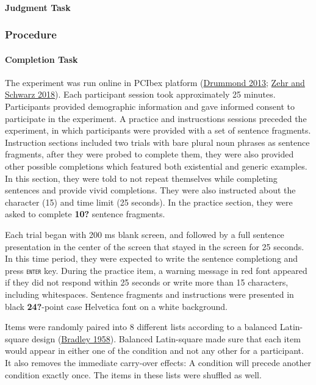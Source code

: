 \documentclass[
  10pt,
  letterpaper,
  DIV=11,
  numbers=noendperiod]{scrartcl}
\let\oldparagraph\paragraph
\renewcommand{\paragraph}[1]{\oldparagraph{#1}\mbox{}}
\begin{document}
\hypertarget{judgment-task}{%
\paragraph{Judgment Task}\label{judgment-task}}

\hypertarget{procedure}{%
\subsubsection{Procedure}\label{procedure}}

\hypertarget{completion-task-1}{%
\paragraph{Completion Task}\label{completion-task-1}}

The experiment was run online in PCIbex platform
(\protect\hyperlink{ref-Drummond2013}{Drummond 2013};
\protect\hyperlink{ref-ZehrSchwarz2018}{Zehr and Schwarz 2018}). Each
participant session took approximately 25 minutes. Participants provided
demographic information and gave informed consent to participate in the
experiment. A practice and instrucstions sessions preceded the
experiment, in which participants were provided with a set of sentence
fragments. Instruction sections included two trials with bare plural
noun phrases as sentence fragments, after they were probed to complete
them, they were also provided other possible completions which featured
both existential and generic examples. In this section, they were told
to not repeat themselves while completing sentences and provide vivid
completions. They were also instructed about the character (15) and time
limit (25 seconds). In the practice section, they were asked to complete
\textbf{10?} sentence fragments.

Each trial began with 200 ms blank screen, and followed by a full
sentence presentation in the center of the screen that stayed in the
screen for 25 seconds. In this time period, they were expected to write
the sentence completiong and press \texttt{\textsc{enter}} key. During
the practice item, a warning message in red font appeared if they did
not respond within 25 seconds or write more than 15 characters,
including whitespaces. Sentence fragments and instructions were
presented in black \textbf{24?}-point case Helvetica font on a white
background.

Items were randomly paired into 8 different lists according to a
balanced Latin-square design
(\protect\hyperlink{ref-Bradley1958}{Bradley 1958}). Balanced
Latin-square made sure that each item would appear in either one of the
condition and not any other for a participant. It also removes the
immediate carry-over effects: A condition will precede another condition
exactly once. The items in these lists were shuffled as well.
\end{document}
